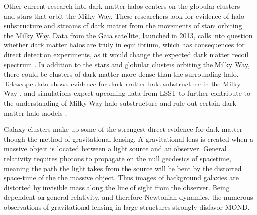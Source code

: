 Other current research into dark matter halos centers on the globular clusters and stars that orbit the Milky Way. These researchers look for evidence of halo substructure and streams of dark matter from the movements of stars orbiting the Milky Way. Data from the Gaia satellite, launched in 2013, calls into question whether dark matter halos are truly in equilibrium, which has consequences for direct detection experiments, as it would change the expected dark matter recoil spectrum \cite{Herzog-Arbeitman2018} \cite{Necib2018}. In addition to the stars and globular clusters orbiting the Milky Way, there could be clusters of dark matter more dense than the surrounding halo. Telescope data shows evidence for dark matter halo substructure in the Milky Way \cite{Erkal2017}, and simulations expect upcoming data from LSST to further contribute to the understanding of Milky Way halo substructure and rule out certain dark matter halo models \cite{Banik2018}.

Galaxy clusters make up some of the strongest direct evidence for dark matter though the method of gravitational lensing. A gravitational lens is created when a massive object is located between a light source and an observer. General relativity requires photons to propagate on the null geodesics of spacetime, meaning the path the light takes from the source will be bent by the distorted space-time of the the massive object. Thus images of background galaxies are distorted by invisible mass along the line of sight from the observer. Being dependent on general relativity, and therefore Newtonian dynamics, the numerous observations of gravitational lensing in large structures strongly disfavor \ac{MOND}. 

